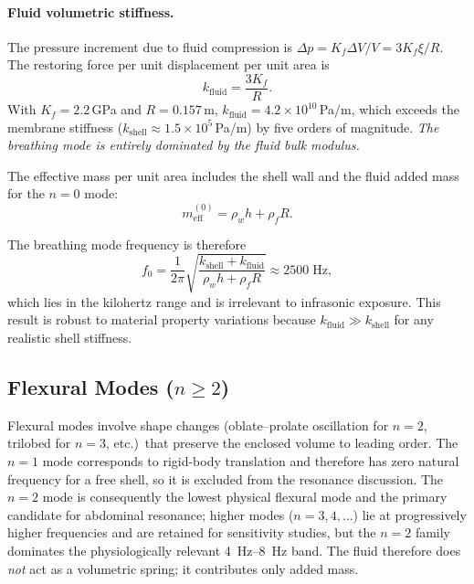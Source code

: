 \paragraph{Fluid volumetric stiffness.}
The pressure increment due to fluid compression is $\Delta p = K_f \Delta V /
V = 3K_f \xi / R$.  The restoring force per unit displacement per unit area is
\begin{equation}\label{eq:kfluid}
  k_\mathrm{fluid} = \frac{3K_f}{R}.
\end{equation}
With $K_f = 2.2$\,GPa and $R = 0.157$\,m, $k_\mathrm{fluid} = 4.2 \times
10^{10}$\,Pa/m, which exceeds the membrane stiffness ($k_\mathrm{shell}
\approx 1.5 \times 10^5$\,Pa/m) by five orders of magnitude.  \emph{The
breathing mode is entirely dominated by the fluid bulk modulus.}

The effective mass per unit area includes the shell wall and the fluid added
mass for the $n = 0$ mode:
\begin{equation}\label{eq:m0}
  m_\mathrm{eff}^{(0)} = \rho_w h + \rho_f R.
\end{equation}

The breathing mode frequency is therefore
\begin{equation}\label{eq:f0}
  f_0 = \frac{1}{2\pi}\sqrt{\frac{k_\mathrm{shell} + k_\mathrm{fluid}}
  {\rho_w h + \rho_f R}} \approx 2500\;\text{Hz},
\end{equation}
which lies in the kilohertz range and is irrelevant to infrasonic exposure.
This result is robust to material property variations because $k_\mathrm{fluid}
\gg k_\mathrm{shell}$ for any realistic shell stiffness.


\subsection{Flexural Modes (\texorpdfstring{$n \geq 2$}{n >= 2})}\label{sec:flexural}

Flexural modes involve shape changes (oblate--prolate oscillation for $n = 2$,
trilobed for $n = 3$, etc.)\ that preserve the enclosed volume to leading
order.  The $n = 1$ mode corresponds to rigid-body translation and therefore
has zero natural frequency for a free shell, so it is excluded from the
resonance discussion.  The $n = 2$ mode is consequently the lowest physical
flexural mode and the primary candidate for abdominal resonance; higher modes
($n = 3, 4, \ldots$) lie at progressively higher frequencies and are retained
for sensitivity studies, but the $n = 2$ family dominates the physiologically
relevant \SIrange{4}{8}{\hertz} band.  The fluid therefore does \emph{not} act
as a volumetric spring; it contributes only added mass.

